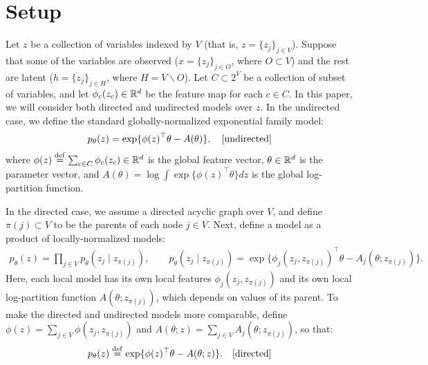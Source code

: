 \section{Setup} \label{sec:setup}

Let $z$ be a collection of variables indexed by $V$ (that is, $z = \{z_j\}_{j \in V}$).
Suppose that some of the variables are observed ($x = \{ z_j \}_{j \in O}$, where $O \subset V$) 
and the rest are latent ($h = \{ z_j \}_{j \in H}$, where $H = V \backslash O$).
Let $C \subset 2^V$ be a collection of subset of variables,
and let $\phi_c(z_c) \in \mathbb{R}^d$ be the feature map for each $c \in C$.
In this paper, we will consider both directed and undirected models over $z$.
In the undirected case, we define the standard globally-normalized exponential family model:
\begin{align}
  p_\theta(z) = \exp\{ \phi(z)^\top\theta - A(\theta) \}, \quad\text{[undirected]}
\end{align}
where $\phi(z) \stackrel{\rm def}{=} \sum_{c \in C} \phi_c(z_c) \in \mathbb{R}^d$ is the global feature vector, $\theta \in \mathbb{R}^d$ is the parameter vector,
and $A(\theta) = \log \int \exp\{\phi(z)^\top\theta\} dz$ is the global log-partition function.

In the directed case, we assume a directed acyclic graph over $V$,
and define $\pi(j) \subset V$ to be the parents of each node $j \in V$.
Next, define a model as a product of locally-normalized models:
\begin{align}
  p_\theta(z) = \prod_{j \in V} p_\theta(z_j \mid z_{\pi(j)}), \quad\quad
  p_\theta(z_j \mid z_{\pi(j)}) = \exp \{ \phi_j(z_j, z_{\pi(j)})^\top\theta - A_j(\theta; z_{\pi(j)}) \}.
\end{align}
Here, each local model has its own local features $\phi_j(z_j, z_{\pi(j)})$
and its own local log-partition function $A(\theta; z_{\pi(j)})$, which depends on values of its parent.
To make the directed and undirected models more comparable,
define $\phi(z) = \sum_{j \in V} \phi(z_j, z_{\pi(j)})$
and $A(\theta; z) = \sum_{j \in V} A_j(\theta; z_{\pi(j)})$,
so that:
\begin{align}
  p_\theta(z) \stackrel{\rm def}{=} \exp\{ \phi(z)^\top\theta - A(\theta; z) \}. \quad\text{[directed]}
\end{align}



